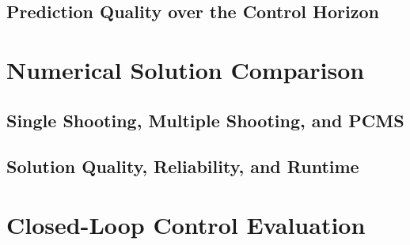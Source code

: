 \subsection{Prediction Quality over the Control Horizon}

\section{Numerical Solution Comparison}

\subsection{Single Shooting, Multiple Shooting, and PCMS}

\subsection{Solution Quality, Reliability, and Runtime}

\section{Closed-Loop Control Evaluation}

